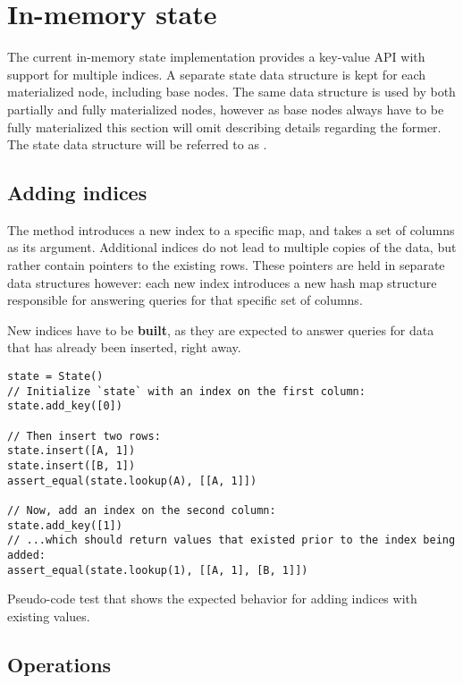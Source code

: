\section{In-memory state}\label{sec:in-memory-state}
The current in-memory state implementation provides a key-value API with support
for multiple indices. A separate state data structure is kept for each
materialized node, including base nodes. The same data structure is used by both
partially and fully materialized nodes, however as base nodes always have to be
fully materialized this section will omit describing details regarding the
former. The state data structure will be referred to as .

\subsection{Adding indices}
The  method introduces a new index to a specific  map,
and takes a set of columns as its argument. Additional indices do not lead to
multiple copies of the data, but rather contain pointers to the existing rows.
These pointers are held in separate data structures however: each new index
introduces a new hash map structure responsible for answering queries for that
specific set of columns.

New indices have to be \textbf{built}, as they are expected to answer queries
for data that has already been inserted, right away.

\begin{listing}[H]
  \begin{verbatim}
state = State()
// Initialize `state` with an index on the first column:
state.add_key([0])

// Then insert two rows:
state.insert([A, 1])
state.insert([B, 1])
assert_equal(state.lookup(A), [[A, 1]])

// Now, add an index on the second column:
state.add_key([1])
// ...which should return values that existed prior to the index being added:
assert_equal(state.lookup(1), [[A, 1], [B, 1]])
  \end{verbatim}

  \caption{Pseudo-code test that shows the expected behavior for adding indices
  with existing values.}\label{lst:existing-index}
\end{listing}

\subsection{Operations}

